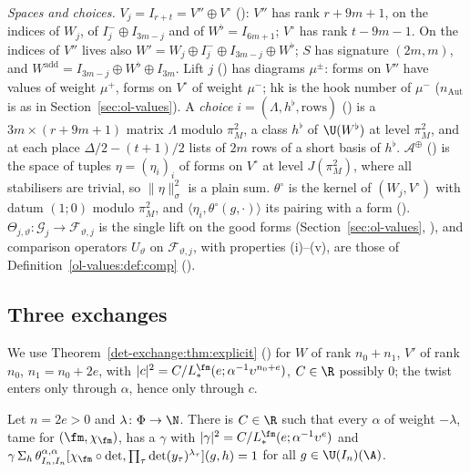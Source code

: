 \emph{Spaces and choices.} $V_j=I_{r+t}=V''\oplus V^\circ$ (): $V''$ has rank
$r+9m+1$, on the indices of $W_j$, of $I_j^-\oplus I_{3m-j}$ and of $W^\flat=I_{6m+1}$; $V^\circ$ has rank
$t-9m-1$. On the indices of $V''$ lives also $W'=W_j\oplus I_j^-\oplus I_{3m-j}\oplus W^\flat$; $S$ has
signature $(2m,m)$, and $W^{\mathrm{add}}=I_{3m-j}\oplus W^\flat\oplus I_{3m}$. Lift $j$
() has diagrams $\mu^\pm$: forms on $V''$ have values of weight $\mu^+$,
forms on $V^\circ$ of weight $\mu^-$; $\mathrm{hk}$ is the hook number of $\mu^-$ ($n_{\mathrm{Aut}}$ is
as in Section~\ref{sec:ol-values}). A \emph{choice}
$i=(\Lambda,h^\flat,\text{rows})$ () is a $3m\times(r+9m+1)$ matrix $\Lambda$
modulo $\pi_M^2$, a class $h^\flat$ of $\U(W^\flat)$ at level $\pi_M^2$, and at each place
$\Delta/2-(t+1)/2$ lists of $2m$ rows of a short basis of $h^\flat$. $\mathcal A^\oplus$
() is the space of tuples $\eta=(\eta_i)_i$ of forms on $V^\circ$ at level
$J(\pi_M^2)$, where all stabilisers are trivial, so $\|\eta\|_\sigma^2$ is a plain sum. $\theta^\circ$
is the kernel of $(W_j,V^\circ)$ with datum $(1;0)$ modulo $\pi_M^2$, and
$\langle\eta_i,\theta^\circ(g,\cdot)\rangle$ its pairing with a form ().
$\Theta_{j,\vartheta}\colon\mathcal G_j\to\mathcal F_{\vartheta,j}$ is the single lift on the good forms
(Section~\ref{sec:ol-values}, ), and comparison operators $U_\vartheta$ on
$\mathcal F_{\vartheta,j}$, with properties (i)--(v), are those of Definition~\ref{ol-values:def:comp}
().

\subsection{Three exchanges}\label{ol-compare:sec:exchanges}

We use Theorem~\ref{det-exchange:thm:explicit} ()
for $W$ of rank $n_0+n_1$, $V'$ of rank $n_0$, $n_1=n_0+2e$, with
$|c|^2=C/L_*^{\fm}(e;\alpha^{-1}\upsilon^{n_0+e})$, $C\in\R$ possibly $0$; the twist
enters only through $\alpha$, hence only through $c$.

\begin{proposition}
\label{ol-compare:prop:rallis}
Let $n=2e>0$ and $\lambda\colon\Phi\to\N$. There is $C\in\R$ such that every $\alpha$ of weight $-\lambda$, tame for
$(\fm,\chi_\fm)$, has a $\gamma$ with $|\gamma|^2=C/L_*^{\fm}(e;\alpha^{-1}\upsilon^e)$ and
$\gamma\,\Sigma_h\,\theta^{\alpha,\alpha}_{I_n,I_n}[\chi_\fm\circ\det,\prod_\tau\det(y_\tau)^{\lambda_\tau}](g,h)=1$
for all $g\in\U(I_n)(\A)$.
\end{proposition}

